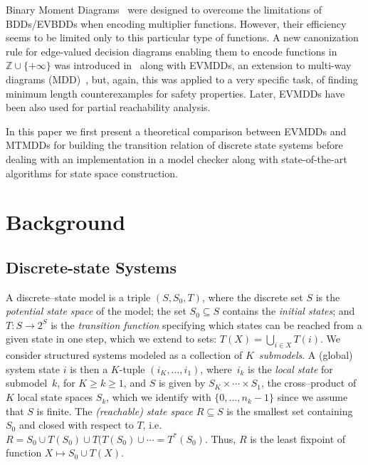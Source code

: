 \documentclass[a4paper]{easychair}
\newcommand{\Z}{\mathbb{Z}}
\begin{document}
Binary Moment Diagrams~\cite{Bryant1994} were designed to overcome the 
limitations of BDDs/EVBDDs when encoding multiplier functions.
However, their efficiency seems to be limited only to this particular 
type of functions.
%
A new canonization rule for edge-valued decision diagrams enabling them 
to encode functions in $\Z \cup \{+\infty\}$ was introduced 
in~\cite{FMCAD2002} along with EVMDDs, an extension to multi-way diagrams 
(MDD)~\cite{Kam1998}, but, again, this was applied to a very specific 
task, of finding minimum length counterexamples for safety properties. 
Later, EVMDDs have been also used for partial reachability analysis.

In this paper we first present a theoretical comparison between EVMDDs 
and MTMDDs for building the transition relation of discrete state 
systems before dealing with an implementation in a model checker along 
with state-of-the-art algorithms for state space construction.

\section{Background}

\subsection{Discrete-state Systems}\label{sec:DSS}

A discrete--state model is a triple $(S,S_0,T)$, where
the discrete set $S$ is the \emph{potential state space} of the model;
the set $S_0\subseteq S$ contains the \emph{initial states};
and $T : S\rightarrow 2^{S}$ is the \emph{transition function}
specifying which states can be reached from a given state in one step, 
which we extend to sets: $T(X) = \bigcup_{i\in X}T(i)$.
We consider structured systems modeled as a collection of $K$~\emph{submodels}.
A (global) system state $i$ is then a $K$-tuple $(i_{K},\ldots,i_{1})$,
where~$i_{k}$ is the \emph{local state} for submodel~$k$,
for $K \!\geq\! k\! \geq\! 1$, and
$S$ is given by $ S_K \times \cdots \times  S_{1}$,
the cross--product of $K$ local state spaces $ S_k$,
which we identify with $\{0,\ldots,n_k\!-\!1\}$ since
we assume that $S$ is finite.
The \emph{(reachable) state space} $R \subseteq S$ is the
smallest set containing $S_0$ and closed with respect to $T$,
i.e.
$R = S_0 \cup T(S_0) \cup
T(T(S_0) \cup \cdots = T^{\ast}(S_0).$
Thus, $R$ is the least fixpoint of function $X \mapsto S_0 \cup T(X)$.
\end{document}
